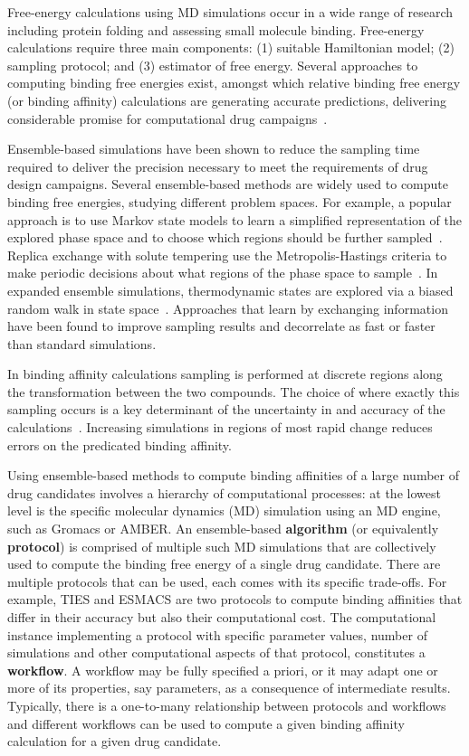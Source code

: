 Free-energy calculations using MD simulations occur in a wide range of
research including protein folding and assessing small molecule binding.
Free-energy calculations require three main components: (1) suitable
Hamiltonian model; (2) sampling protocol; and (3) estimator of free energy.
Several approaches to computing binding free energies exist, amongst which
relative binding free energy (or binding affinity) calculations are
generating accurate predictions, delivering considerable promise for
computational drug campaigns~\cite{Karplus2005}.

Ensemble-based simulations have been shown to reduce the sampling time
required to deliver the precision necessary to meet the requirements of drug
design campaigns. Several ensemble-based methods are widely used to compute
binding free energies, studying different problem spaces. For example, a
popular approach is to use Markov state models to learn a simplified
representation of the explored phase space and to choose which regions should
be further sampled~\cite{Bowman2010}. Replica exchange with solute tempering
use the Metropolis-Hastings criteria to make periodic decisions about what
regions of the phase space to sample~\cite{Earl2005,Hritz2008,Kim2012}. In
expanded ensemble simulations, thermodynamic states are explored via a biased
random walk in state space~\cite{Lyubartsev1992}. Approaches that learn by
exchanging information have been found to improve sampling results and
decorrelate as fast or faster than standard simulations.

In binding affinity calculations sampling is performed at discrete regions
along the transformation between the two compounds. The choice of where
exactly this sampling occurs is a key determinant of the uncertainty in and
accuracy of the calculations~\cite{Ruiter2013,Ruiter2016}. Increasing
simulations in regions of most rapid change reduces errors on the predicated
binding affinity.

Using ensemble-based methods to compute binding affinities of a large number
of drug candidates involves a hierarchy of computational processes: at the
lowest level is the specific molecular dynamics (MD) simulation using an MD
engine, such as Gromacs or AMBER. An ensemble-based \textbf{algorithm} (or
equivalently \textbf{protocol}) is comprised of multiple such MD simulations
that are collectively used to compute the binding free energy of a single drug
candidate. There are multiple protocols that can be used, each comes with its
specific trade-offs. For example, TIES and ESMACS are two protocols to compute
binding affinities that differ in their accuracy but also their computational
cost. The computational instance implementing a protocol with specific
parameter values, number of simulations and other computational aspects of
that protocol, constitutes a \textbf{workflow}. A workflow may be fully
specified a priori, or it may adapt one or more of its properties, say parameters,
as a consequence of intermediate results. Typically, there is a one-to-many
relationship between protocols and workflows and different workflows can be
used to compute a given binding affinity calculation for a given drug
candidate.

